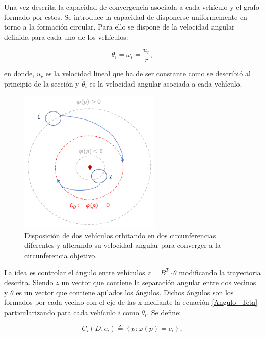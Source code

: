 Una vez descrita la capacidad de convergencia asociada a cada vehículo y el grafo formado por estos. Se introduce la capacidad de disponerse uniformemente en torno a la formación circular. Para ello se dispone de la velocidad angular definida para cada uno de los vehículos:

\begin{equation}
	\dot{\theta}_{i}=\omega_{i}=\frac{u_{r}}{r},
\end{equation}

en donde, $u_{r}$ es la velocidad lineal que ha de ser constante como se describió al principio de la sección y $\dot{\theta}_{i}$ es la velocidad angular asociada a cada vehículo.
\newpage

\begin{figure}[H]
\centering
\includegraphics[width=0.60\textwidth]{figures/Pruea_Coordinacion.eps}
\caption{Disposición de dos vehículos orbitando en dos circunferencias diferentes y alterando su velocidad angular para converger a la circunferencia objetivo.} \label{Ejemplo_Coordinacion}
\end{figure}

La idea es controlar el ángulo entre vehículos $z = B^{T}\cdot\theta$ modificando la trayectoria descrita. Siendo $z$ un vector que contiene la separación angular entre dos vecinos y $\theta$ es un vector que contiene apilados los ángulos. Dichos ángulos son los formados por cada vecino con el eje de las x mediante la ecuación \ref{Angulo_Teta} particularizando para cada vehículo $i$ como $\theta_{i}$. Se define:

\begin{equation}\label{Control}
	C_i\left(D,c_{i}\right)\triangleq\left\lbrace{p:\varphi\left(p\right)=c_{i}}\right\rbrace,
\end{equation}

